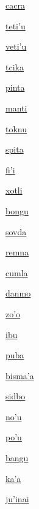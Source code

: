 {\hyperlink{val:cacra}{cacra}}{}{}{}

{\hyperlink{val:tetihu}{teti'u}}{}{}{}

{\hyperlink{val:vetihu}{veti'u}}{}{}{}

{\hyperlink{val:tcika}{tcika}}{}{}{}

{\hyperlink{val:pinta}{pinta}}{}{}{}

{\hyperlink{val:manti}{manti}}{}{}{}

{\hyperlink{val:toknu}{toknu}}{}{}{}

{\hyperlink{val:spita}{spita}}{}{}{}

{\hyperlink{val:fihi}{fi'i}}{}{}{}

{\hyperlink{val:xotli}{xotli}}{}{}{}

{\hyperlink{val:bongu}{bongu}}{}{}{}

{\hyperlink{val:sovda}{sovda}}{}{}{}

{\hyperlink{val:remna}{remna}}{}{}{}

{\hyperlink{val:cumla}{cumla}}{}{}{}

{\hyperlink{val:danmo}{danmo}}{}{}{}

{\hyperlink{val:zoho}{zo'o}}{}{}{}

{\hyperlink{val:ibu}{ibu}}{}{}{}

{\hyperlink{val:puba}{puba}}{}{}{}

{\hyperlink{val:bismaha}{bisma'a}}{}{}{}

{\hyperlink{val:sidbo}{sidbo}}{}{}{}

{\hyperlink{val:nohu}{no'u}}{}{}{}

{\hyperlink{val:pohu}{po'u}}{}{}{}

{\hyperlink{val:bangu}{bangu}}{}{}{}

{\hyperlink{val:kaha}{ka'a}}{}{}{}

{\hyperlink{val:juhinai}{ju'inai}}{}{}{}

